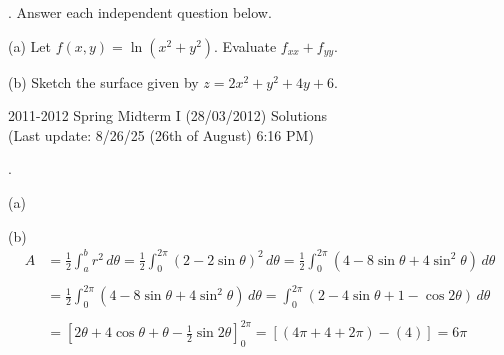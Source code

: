 \documentclass{article}
\begin{document}
\hfill

\hfill

. Answer each independent question below.

\hfill

(a) Let $f(x,y)=\ln\left(x^2+y^2\right)$. Evaluate $f_{xx}+f_{yy}$.

\hfill

(b) Sketch the surface given by $z=2x^2+y^2+4y+6$.

\newpage

\begin{center}
2011-2012 Spring Midterm I (28/03/2012) Solutions\\
(Last update: 8/26/25 (26th of August) 6:16 PM)
\end{center}

.

\hfill

\noindent (a)
\begin{center}
\end{center}

\noindent (b)
\begin{align*}A&=\frac12\int_a^br^2\,d\theta=\frac12\int_0^{2\pi}\left(2-2\sin\theta\right)^2\,d\theta=\frac12\int_0^{2\pi}\left(4-8\sin\theta+4\sin^2\theta\right)\,d\theta\\\\&=\frac12\int_0^{2\pi}\left(4-8\sin\theta+4\sin^2\theta\right)\,d\theta=\int_0^{2\pi}\left(2-4\sin\theta+1-\cos2\theta\right)\,d\theta\\\\&=\left[2\theta+4\cos\theta+\theta-\frac12\sin2\theta\right]_0^{2\pi}=\left[\left(4\pi+4+2\pi\right)-(4)\right]=\boxed{6\pi}\end{align*}
\end{document}
